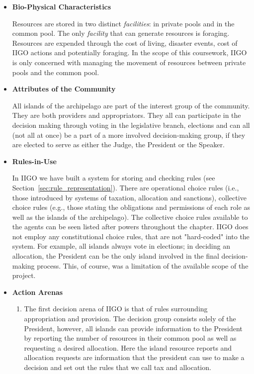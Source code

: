 \begin{itemize}
    \item \textbf{Bio-Physical Characteristics}
    
    Resources are stored in two distinct \emph{facilities}: in private pools and in the common pool. The only \emph{facility} that can generate resources is foraging. Resources are expended through the cost of living, disaster events, cost of IIGO actions and potentially foraging. In the scope of this coursework, IIGO is only concerned with managing the movement of resources between private pools and the common pool. 
    
    \item \textbf{Attributes of the Community}
    
    All islands of the archipelago are part of the interest group of the community. They are both providers and appropriators. They all can participate in the decision making through voting in the legislative branch, elections and can all (not all at once) be a part of a more involved decision-making group, if they are elected to serve as either the Judge, the President or the Speaker. 

    \item \textbf{Rules-in-Use}
    
    In IIGO we have built a system for storing and checking rules (see Section~\ref*{sec:rule_representation}). There are operational choice rules (i.e., those introduced by systems of taxation, allocation and sanctions), collective choice rules (e.g., those stating the obligations and permissions of each role as well as the islands of the archipelago). The collective choice rules available to the agents can be seen listed after powers throughout the chapter. IIGO does not employ any constitutional choice rules, that are not "hard-coded" into the system. For example, all islands always vote in elections; in deciding an allocation, the President can be the only island involved in the final decision-making process. This, of course, was a limitation of the available scope of the project.
    
    \item \textbf{Action Arenas}
    \begin{enumerate}
        \item The first decision arena of IIGO is that of rules surrounding appropriation and provision. The decision group consists solely of the President, however, all islands can provide information to the President by reporting the number of resources in their common pool as well as requesting a desired allocation. Here the island resource reports and allocation requests are information that the president can use to make a decision and set out the rules that we call tax and allocation. 
        

\end{enumerate}
\end{itemize}
